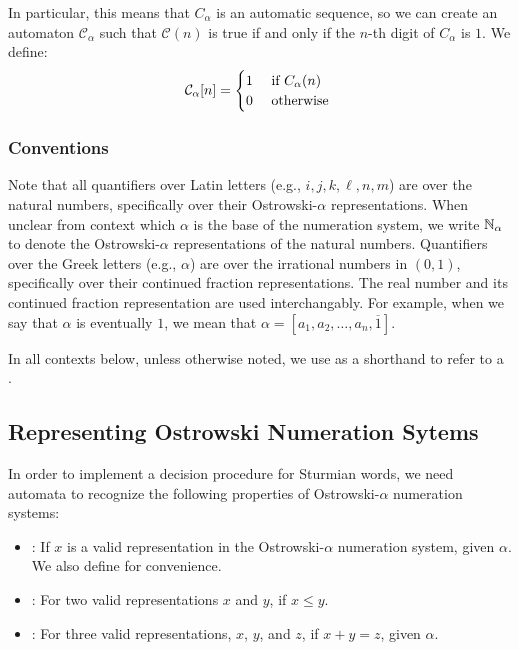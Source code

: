 In particular, this means that $C_{\alpha}$ is an automatic sequence, so we can create an automaton $\mathcal{C}_{\alpha}$ such that $\mathcal{C}(n)$ is true if and only if the $n$-th digit of $C_{\alpha}$ is $1$.
We define:
\[
    \mathcal{C}_{\alpha}[n] = 
    \begin{cases}
        1 & ~\text{if}~ C_{\alpha}(n) \\
        0 & ~\text{otherwise}~
    \end{cases}
\]

\subsubsection{Conventions}

Note that all quantifiers over Latin letters (e.g., $i, j, k, \ell, n, m$) are over the natural numbers, specifically over their Ostrowski-$\alpha$ representations.
When unclear from context which $\alpha$ is the base of the numeration system, we write $\mathbb{N}_{\alpha}$ to denote the Ostrowski-$\alpha$ representations of the natural numbers.
Quantifiers over the Greek letters (e.g., $\alpha$) are over the irrational numbers in $(0, 1)$, specifically over their continued fraction representations.
The real number and its continued fraction representation are used interchangably.
For example, when we say that $\alpha$ is eventually $1$, we mean that $\alpha = [a_1, a_2, \ldots, a_n, \overline{1}]$.

In all contexts below, unless otherwise noted, we use  as a shorthand to refer to a .

\subsection{Representing Ostrowski Numeration Sytems}

In order to implement a decision procedure for Sturmian words, we need automata to recognize the following properties of Ostrowski-$\alpha$ numeration systems:


\begin{itemize}
    \item {}: If $x$ is a valid representation in the Ostrowski-$\alpha$ numeration system, given $\alpha$.
    We also define  for convenience.
    
    \item {}: For two valid representations $x$ and $y$, if $x \leq y$.
    
    \item {}: For three valid representations, $x$, $y$, and $z$, if $x + y = z$, given $\alpha$.
\end{itemize}

